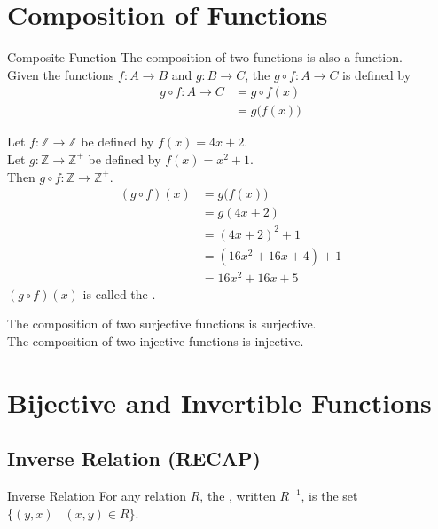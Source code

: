 \documentclass[../notes.tex]{subfiles}
\begin{document}
		\section{Composition of Functions}
				\begin{definition}{Composite Function}
					The composition of two functions is also a function.\\
					Given the functions $f: A \rightarrow B$ and $g: B \rightarrow C$, the  $g \circ f: A \rightarrow C$ is defined by
					\begin{align*}
						g \circ f: A \rightarrow C &= g \circ f(x)\\
						&= g\bigl(f(x)\bigr)
					\end{align*}
				\end{definition}
			\begin{example}
				Let $f: \mathbb{Z} \rightarrow \mathbb{Z}$ be defined by $f(x) = 4x + 2$.\\
				Let $g: \mathbb{Z} \rightarrow \mathbb{Z}^{+}$ be defined by $f(x) = x^{2} + 1$.\\
				Then $g \circ f: \mathbb{Z} \rightarrow \mathbb{Z}^{+}$.
				\begin{align*}
					(g \circ f)(x) &= g\bigl(f(x)\bigr)\\
					&= g(4x + 2)\\
					&= (4x + 2)^{2} + 1\\
					&= \left(16x^{2} + 16x + 4\right) + 1\\
					&= 16x^{2} + 16x + 5
				\end{align*}
				$(g \circ f)(x)$ is called the .
			\end{example}
			The composition of two surjective functions is surjective.\\
			The composition of two injective functions is injective.
		\pagebreak
		\section{Bijective and Invertible Functions}
			\subsection[Inverse Relation]{Inverse Relation (RECAP)}
				\begin{definition}{Inverse Relation}
					For any relation $R$, the , written $R^{-1}$, is the set $\bigl\{(y, x) \mid (x, y) \in R\bigr\}$.
				\end{definition}
\end{document}
